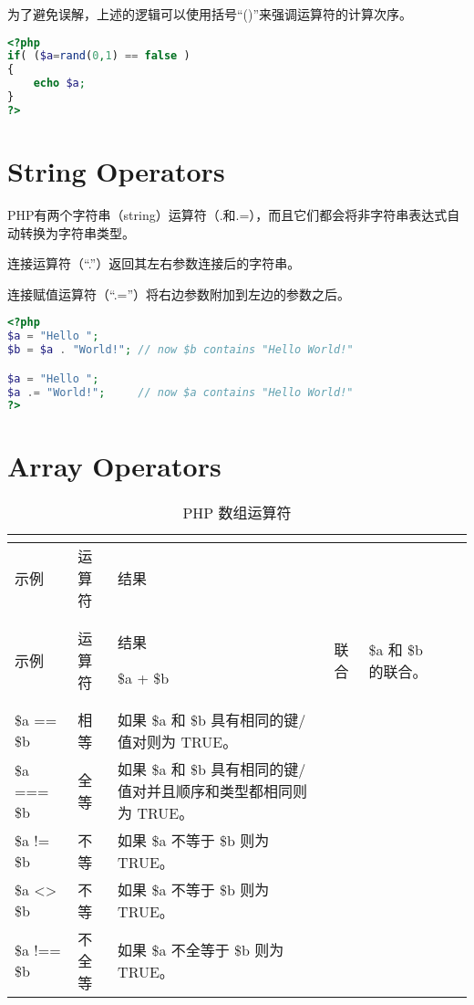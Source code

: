 为了避免误解，上述的逻辑可以使用括号“()”来强调运算符的计算次序。

\begin{lstlisting}[language=PHP]
<?php
if( ($a=rand(0,1) == false )
{
	echo $a;
}
?>
\end{lstlisting}


\section{String Operators}


PHP有两个字符串（string）运算符（.和.=），而且它们都会将非字符串表达式自动转换为字符串类型。

\begin{compactitem}
\item 连接运算符（“.”）返回其左右参数连接后的字符串。
\item 连接赋值运算符（“.=”）将右边参数附加到左边的参数之后。
\end{compactitem}

\begin{lstlisting}[language=PHP]
<?php
$a = "Hello ";
$b = $a . "World!"; // now $b contains "Hello World!"

$a = "Hello ";
$a .= "World!";     // now $a contains "Hello World!"
?>
\end{lstlisting}

\section{Array Operators}

\begin{longtable}{|l|l|l|}
\tabularnewline\hline
示例&运算符		&结果
\endhead

\caption{PHP 数组运算符}\\
\hline
示例&运算符		&结果
\endfirsthead

\endfoot

\endlastfoot
\hline
\$a + \$b		&联合	&\$a 和 \$b 的联合。\\
\hline
\$a == \$b	&相等	&如果 \$a 和 \$b 具有相同的键/值对则为 TRUE。\\
\hline
\$a === \$b	&全等	&如果 \$a 和 \$b 具有相同的键/值对并且顺序和类型都相同则为 TRUE。\\
\hline
\$a != \$b	&不等	&如果 \$a 不等于 \$b 则为 TRUE。\\
\hline
\$a <> \$b	&不等	&如果 \$a 不等于 \$b 则为 TRUE。\\
\hline
\$a !== \$b	&不全等	&如果 \$a 不全等于 \$b 则为 TRUE。\\
\hline
\end{longtable}

